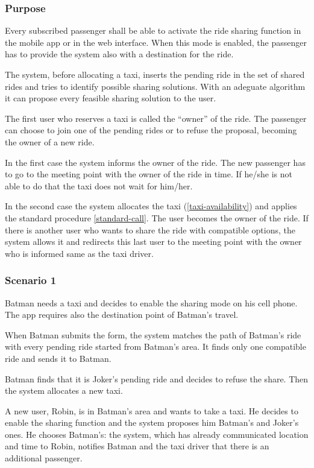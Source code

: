 \label{ride-sharing}
\subsubsection{Purpose}

Every subscribed passenger shall be able to activate the ride sharing function in the mobile app or in the web interface. When this mode is enabled, the passenger has to provide the system also with a destination for the ride.

The system, before allocating a taxi, inserts the pending ride in the set of shared rides and tries to identify possible sharing solutions.
With an adeguate algorithm it can propose every feasible sharing solution to the user.

The first user who reserves a taxi is called the ``owner'' of the ride.
The passenger can choose to join one of the pending rides or to refuse the proposal, becoming the owner of a new ride.

In the first case the system informs the owner of the ride. The new passenger has to go to the meeting point with the owner of the ride in time. If he/she is not able to do that the taxi does not wait for him/her.

In the second case the system allocates the taxi (\ref{taxi-availability}) and applies the standard procedure \ref{standard-call}.  The user becomes the owner of the ride. 
If there is another user who wants to share the ride with compatible options, the system allows it and redirects this last user to the meeting point with the owner who is informed same as the taxi driver.

\subsubsection{Scenario 1}
Batman needs a taxi and decides to enable the sharing mode on his cell phone. The app requires also the destination point of Batman's travel.
 
When Batman submits the form, the system matches the path of Batman's ride with every pending ride started from Batman's area. It finds only one compatible ride and sends it to Batman.
 
Batman finds that it is Joker's pending ride and decides to refuse the share. Then the system allocates a new taxi.

A new user, Robin, is in Batman's area and wants to take a taxi. He decides to enable the sharing function and the system proposes him Batman's and Joker's ones. He chooses Batman's: the system, which has already communicated location and time to Robin, notifies Batman and the taxi driver that there is an additional passenger.


